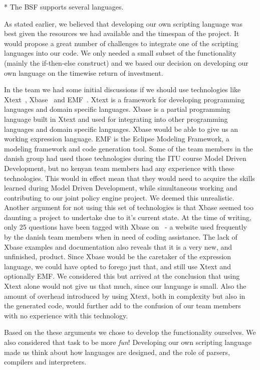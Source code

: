 * The BSF supports several languages.

As stated earlier, we believed that developing our own scripting language was best given the resources we had available and the timespan of the project. It would propose a great number of challenges to integrate one of the scripting languages into our code. We only needed a small subset of the functionality (mainly the if-then-else construct) and we based our decision on developing our own language on the timewise return of investment.

In the team we had some initial discussions if we should use technologies like Xtext~\cite{xtext}, Xbase~\cite{xbase} and EMF~\cite{emf}. Xtext is a framework for developing programming languages and domain specific languages. Xbase is a partial programming language built in Xtext and used for integrating into other programming languages and domain specific languages. Xbase would be able to give us an working expression language. EMF is the Eclipse Modeling Framework, a modeling framework and code generation tool. Some of the team members in the danish group had used those technologies during the ITU course Model Driven Development, but no kenyan team members had any experience with these technologies. This would in effect mean that they would need to acquire the skills learned during Model Driven Development, while simultaneous working and contributing to our joint policy engine project. We deemed this unrealistic. Another argument for not using this set of technologies is that Xbase seemed too daunting a project to undertake due to it's current state. At the time of writing, only 25 questions have been tagged with Xbase on~\cite{stackoverflow} - a website used frequently by the danish team members when in need of coding assistance. The lack of Xbase examples and documentation also reveals that it is a very new, and unfinished, product. Since Xbase would be the caretaker of the expression language, we could have opted to forego just that, and still use Xtext and optionally EMF. We considered this but arrived at the conclusion that using Xtext alone would not give us that much, since our language is small. Also the amount of overhead introduced by using Xtext, both in complexity but also in the generated code, would further add to the confusion of our team members with no experience with this technology. 

Based on the these arguments we chose to develop the functionality ourselves. We also considered that task to be more \textit{fun}! Developing our own scripting language made us think about how languages are designed, and the role of parsers, compilers and interpreters.